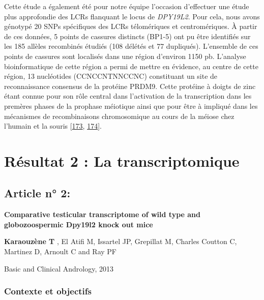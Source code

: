 \documentclass[12pt,twoside]{reedthesis}
\theoremstyle{definition}
\theoremstyle{definition}
\theoremstyle{remark}
\begin{document}
  Cette étude a également été pour notre équipe l'occasion d'effectuer une
  étude plus approfondie des LCRs flanquant le locus de \emph{DPY19L2}.
  Pour cela, nous avons génotypé 20 SNPs spécifiques des LCRs télomériques
  et centromériques. À partir de ces données, 5 points de cassures
  distincts (BP1-5) ont pu être identifiés sur les 185 allèles recombinés
  étudiés (108 délétés et 77 dupliqués). L'ensemble de ces points de
  cassures sont localisés dans une région d'environ 1150 pb. L'analyse
  bioinformatique de cette région a permi de mettre en évidence, au centre
  de cette région, 13 nucléotides (CCNCCNTNNCCNC) constituant un site de
  reconnaissance consensus de la protéine PRDM9. Cette protéine à doigts
  de zinc étant connue pour son rôle central dans l'activation de la
  transcription dans les premères phases de la prophase méiotique ainsi
  que pour être à impliqué dans les mécanismes de recombinaisons
  chromosomique au cours de la méiose chez l'humain et la souris
  {[}\protect\hyperlink{ref-Parvanov2010}{173},
  \protect\hyperlink{ref-Baudat2010}{174}{]}.
  
  \newpage
  
  \section{Résultat 2 : La transcriptomique}\label{transcriptome}
  
  \subsection{Article n° 2:}\label{article-n-2}
  
  \textbf{Comparative testicular transcriptome of wild type and
  globozoospermic Dpy19l2 knock out mice}
  
  \textbf{Karaouzène T} , El Atifi M, Issartel JP, Grepillat M, Charles
  Coutton C, Martinez D, Arnoult C and Ray PF
  
  Basic and Clinical Andrology, 2013
  
  \newpage
  
  \subsubsection{Contexte et objectifs}\label{contexte-et-objectifs-1}
  
\end{document}
